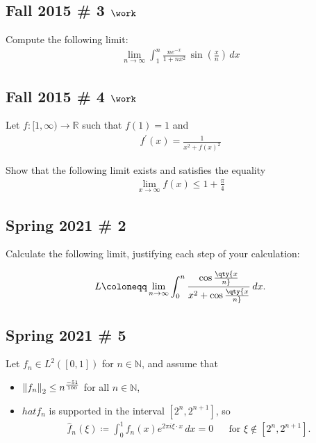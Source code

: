 \hypertarget{fall-2015-3-work}{%
\subsection{\texorpdfstring{Fall 2015 \# 3
\(\work\)}{Fall 2015 \# 3 \textbackslash work}}\label{fall-2015-3-work}}

Compute the following limit:
\begin{align*}
\lim _{n \rightarrow \infty} \int_{1}^{n} \frac{n e^{-x}}{1+n x^{2}} \, \sin \left(\frac x n\right) \, dx
\end{align*}

\hypertarget{fall-2015-4-work}{%
\subsection{\texorpdfstring{Fall 2015 \# 4
\(\work\)}{Fall 2015 \# 4 \textbackslash work}}\label{fall-2015-4-work}}

Let \(f: [1, \infty) \to {\mathbb{R}}\) such that \(f(1) = 1\) and
\begin{align*}
f^{\prime}(x)= \frac{1} {x^{2}+f(x)^{2}}
\end{align*}

Show that the following limit exists and satisfies the equality
\begin{align*}
\lim _{x \rightarrow \infty} f(x) \leq 1 + \frac \pi 4
\end{align*}

\hypertarget{spring-2021-2}{%
\subsection{Spring 2021 \# 2}\label{spring-2021-2}}

Calculate the following limit, justifying each step of your calculation:

\begin{align*}
L \coloneqq\lim_{n\to \infty} \int_0^n { \cos\qty{x\over n} \over x^2 + \cos\qty{x\over n} }\,dx
.\end{align*}

\hypertarget{spring-2021-5}{%
\subsection{Spring 2021 \# 5}\label{spring-2021-5}}

Let \(f_n \in L^2([0, 1])\) for \(n\in {\mathbb{N}}\), and assume that

\begin{itemize}
\item
  \({\left\lVert {f_n} \right\rVert}_2 \leq n^{-51 \over 100}\) for all
  \(n\in {\mathbb{N}}\),
\item
  \(hat{f}_n\) is supported in the interval \([2^n, 2^{n+1}]\), so
  \begin{align*}
  \widehat{f}_n(\xi) \coloneqq\int_0^1 f_n(x) e^{2\pi i \xi \cdot x} \,dx= 0 && \text{for } \xi \not\in [2^n, 2^{n+1}]
  .\end{align*}
\end{itemize}

